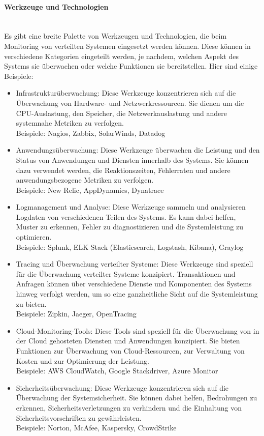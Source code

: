 \paragraph{Werkzeuge und Technologien\\\\}
Es gibt eine breite Palette von Werkzeugen und Technologien, die beim Monitoring von verteilten Systemen eingesetzt werden können. Diese können in verschiedene Kategorien eingeteilt werden, je nachdem, welchen Aspekt des Systems sie überwachen oder welche Funktionen sie bereitstellen. Hier sind einige Beispiele:
\begin{itemize}
\item Infrastrukturüberwachung: Diese Werkzeuge konzentrieren sich auf die Überwachung von Hardware- und Netzwerkressourcen. Sie dienen um die CPU-Auslastung, den Speicher, die Netzwerkauslastung und andere systemnahe Metriken zu verfolgen.\\
Beispiele: Nagios, Zabbix, SolarWinds, Datadog
\item Anwendungsüberwachung: Diese Werkzeuge überwachen die Leistung und den Status von Anwendungen und Diensten innerhalb des Systems. Sie können dazu verwendet werden, die Reaktionszeiten, Fehlerraten und andere anwendungsbezogene Metriken zu verfolgen.\\
Beispiele: New Relic, AppDynamics, Dynatrace
\item Logmanagement und Analyse: Diese Werkzeuge sammeln und analysieren Logdaten von verschiedenen Teilen des Systems. Es kann dabei helfen, Muster zu erkennen, Fehler zu diagnostizieren und die Systemleistung zu optimieren.\\
Beispiele: Splunk, ELK Stack (Elasticsearch, Logstash, Kibana), Graylog
\item Tracing und Überwachung verteilter Systeme: Diese Werkzeuge sind speziell für die Überwachung verteilter Systeme konzipiert. Transaktionen und Anfragen können über verschiedene Dienste und Komponenten des Systems hinweg verfolgt werden, um so eine ganzheitliche Sicht auf die Systemleistung zu bieten.\\
Beispiele: Zipkin, Jaeger, OpenTracing
\item Cloud-Monitoring-Tools: Diese Tools sind speziell für die Überwachung von in der Cloud gehosteten Diensten und Anwendungen konzipiert. Sie bieten Funktionen zur Überwachung von Cloud-Ressourcen, zur Verwaltung von Kosten und zur Optimierung der Leistung.\\
Beispiele: AWS CloudWatch, Google Stackdriver, Azure Monitor
\item Sicherheitsüberwachung: Diese Werkzeuge konzentrieren sich auf die Überwachung der Systemsicherheit. Sie können dabei helfen, Bedrohungen zu erkennen, Sicherheitsverletzungen zu verhindern und die Einhaltung von Sicherheitsvorschriften zu gewährleisten.\\
Beispiele: Norton, McAfee, Kaspersky, CrowdStrike
\end{itemize}
